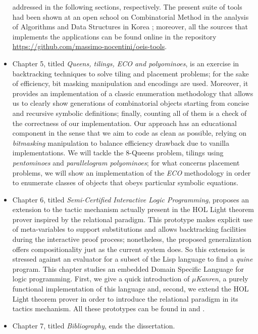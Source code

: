 \documentclass[a4paper, 10pt]{article}
\begin{document}
\begin{itemize}
addressed in the following sections, respectively.
The present suite of tools had been shown at an open school on Combinatorial
Method in the analysis of Algorithms and Data Structures in Korea
\citep{Nocentini:korea}; moreover, all the sources that implements the
applications can be found online in the repository
\url{https://github.com/massimo-nocentini/oeis-tools}.
\item Chapter 5, titled \textit{Queens, tilings, ECO
and polyominoes}, is an exercise in
backtracking techniques to solve tiling and placement problems; for the sake of
efficiency, bit masking manipulation and encodings are used. Moreover, it
provides an implementation of a classic enumeration methodology that allows us
to clearly show generations of combinatorial objects starting from concise and
recursive symbolic definitions; finally, counting all of them is a check of
the correctness of our implementation.  
Our approach has an educational component in the sense that we aim to code as
clean as possible, relying on \textit{bitmasking} manipulation to balance
efficiency drawback due to vanilla implementations. We will tackle the
$8$-Queens problem, tilings using \textit{pentominoes} and
\textit{parallelogram polyominoes}; for what concerns placement problems, we
will show an implementation of the \textit{ECO} methodology in order to
enumerate classes of objects that obeys particular symbolic equations.
\item Chapter 6, titled \textit{Semi-Certified Interactive
Logic Programming}, proposes an extension to the tactic mechanism actually
present in the HOL Light theorem prover inspired by the relational paradigm.
This prototype makes explicit use of meta-variables to support substitutions
and allows backtracking facilities during the interactive proof process;
nonetheless, the proposed generalization offers compositionality just as the
current system does. So this extension is stressed against an evaluator for a
subset of the Lisp language to find a \textit{quine} program.  This chapter
studies an embedded Domain Specific Language for logic programming.  First, we
give a quick introduction of \textit{$\mu$Kanren}, a purely functional
implementation of this language and, second, we extend the HOL Light theorem
prover in order to introduce the relational paradigm in its tactics mechanism.
All these prototypes can be found in \citep{Nocentini:kanrens} and
\citep{Maggesi:Nocentini:kanrenlight}.
\item Chapter 7, titled \textit{Bibliography}, ends the dissertation. 
\end{itemize}
\end{document}
